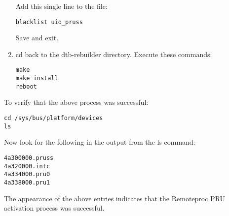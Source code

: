 \begin{enumerate}
Add this single line to the file:
\begin{verbatim}
blacklist uio_pruss
\end{verbatim}
Save and exit.
\item
cd back to the dtb-rebuilder directory.  Execute these commands:
\begin{verbatim}
make 
make install 
reboot
\end{verbatim} 
\end{enumerate}
To verify that the above process was successful:

\begin{verbatim}
cd /sys/bus/platform/devices
ls
\end{verbatim}

Now look for the following in the output from the ls command:
\begin{verbatim}
4a300000.pruss
4a320000.intc
4a334000.pru0
4a338000.pru1
\end{verbatim}

The appearance of the above entries indicates that the Remoteproc PRU activation process was successful.

